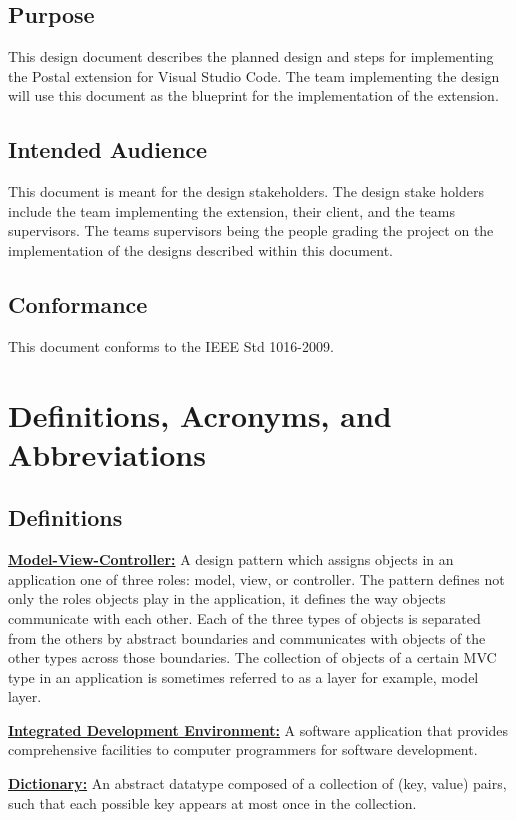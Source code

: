 \documentclass[letterpaper,10pt,titlepage,draftclsnofoot,onecolumn,onesided] {IEEEtran}
\begin{document}
\subsection{Purpose}
This design document describes the planned design and steps for implementing the Postal extension for Visual Studio Code. 
The team implementing the design will use this document as the blueprint for the implementation of the extension. 

\subsection{Intended Audience}
This document is meant for the design stakeholders. 
The design stake holders include the team implementing the extension, their client, and the teams supervisors. 
The teams supervisors being the people grading the project on the implementation of the designs described within this document.

\subsection{Conformance}
This document conforms to the IEEE Std 1016-2009.

\section{Definitions, Acronyms, and Abbreviations}

\subsection{Definitions}
\underline{\textbf{Model-View-Controller:}} A design pattern which assigns objects in an application one of three roles: model, view, or controller. 
The pattern defines not only the roles objects play in the application, it defines the way objects communicate with each other. 
Each of the three types of objects is separated from the others by abstract boundaries and communicates with objects of the other types across those boundaries. 
The collection of objects of a certain MVC type in an application is sometimes referred to as a layer for example, model layer.\cite{appleMVC} 

\underline{\textbf{Integrated Development Environment:}} A software application that provides comprehensive facilities to computer programmers for software development. 

\underline{\textbf{Dictionary:}} An abstract datatype composed of a collection of (key, value) pairs, such that each possible key appears at most once in the collection.
\end{document}
